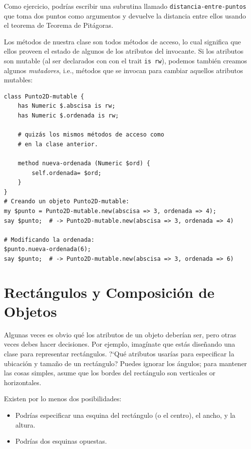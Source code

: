 Como ejercicio, podrías escribir una subrutina llamado 
\verb|distancia-entre-puntos| que toma dos puntos
como argumentos y devuelve la distancia entre ellos 
usando el teorema de Teorema de Pitágoras.

Los métodos de nuestra clase son todos métodos de acceso,
lo cual significa que ellos proveen el estado de algunos de los atributos
del invocante. Si los atributos son mutable (al ser declarados con
con el trait \verb|is rw|), podemos también creamos algunos \emph{mutadores},
i.e., métodos que se invocan para cambiar aquellos atributos mutables:

\begin{lstlisting}
class Punto2D-mutable {
    has Numeric $.abscisa is rw;
    has Numeric $.ordenada is rw;
    
    # quizás los mismos métodos de acceso como
    # en la clase anterior.
    
    method nueva-ordenada (Numeric $ord) {
        self.ordenada= $ord; 
    }
}
# Creando un objeto Punto2D-mutable:
my $punto = Punto2D-mutable.new(abscisa => 3, ordenada => 4);
say $punto;  # -> Punto2D-mutable.new(abscisa => 3, ordenada => 4)

# Modificando la ordenada:
$punto.nueva-ordenada(6);
say $punto;  # -> Punto2D-mutable.new(abscisa => 3, ordenada => 6)
\end{lstlisting}




\section{Rectángulos y Composición de Objetos}
\label{rectangles}

Algunas veces es obvio qué los atributos de un objeto deberían ser,
pero otras veces debes hacer decisiones. Por ejemplo, imagínate que estás
diseñando una clase para representar rectángulos. ?`Qué atributos usarías para
especificar la ubicación y tamaño de un rectángulo? Puedes ignorar 
los ángulos; para mantener las cosas simples, asume que los bordes 
del rectángulo son verticales or horizontales.

Existen por lo menos dos posibilidades:

\begin{itemize}

\item Podrías especificar una esquina del rectángulo (o el centro), 
el ancho, y la altura.

\item Podrías dos esquinas opuestas.

\end{itemize}

